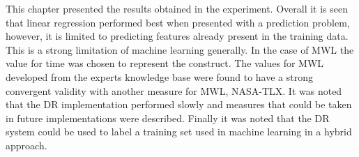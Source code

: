 This chapter presented the results obtained in the experiment. Overall it is seen that linear regression performed best when presented with a prediction problem, however, it is limited to predicting features already present in the training data. This is a strong limitation of machine learning generally. In the case of MWL the value for time was chosen to represent the construct. The values for MWL developed from the experts knowledge base were found to have a strong convergent validity with another measure for MWL, NASA-TLX. It was noted that the DR implementation performed slowly and measures that could be taken in future implementations were described. Finally it was noted that the DR system could be used to label a training set used in machine learning in a hybrid approach. 